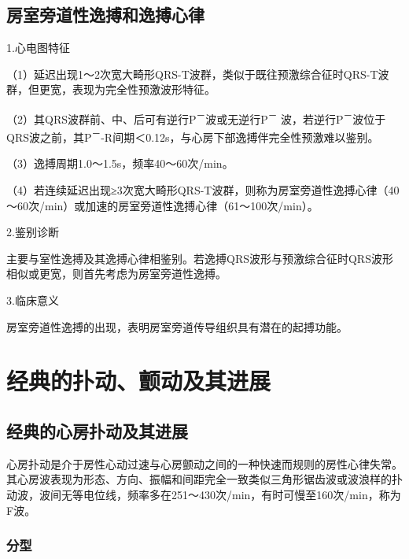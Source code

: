 \protect\hypertarget{text00019.htmlux5cux23subid190}{}{}

\section{房室旁道性逸搏和逸搏心律}

1.心电图特征

（1）延迟出现1～2次宽大畸形QRS-T波群，类似于既往预激综合征时QRS-T波群，但更宽，表现为完全性预激波形特征。

（2）其QRS波群前、中、后可有逆行P\textsuperscript{－}波或无逆行P\textsuperscript{－} 波，若逆行P\textsuperscript{－}波位于QRS波之前，其P\textsuperscript{－}-R间期＜0.12s，与心房下部逸搏伴完全性预激难以鉴别。

（3）逸搏周期1.0～1.5s，频率40～60次/min。

（4）若连续延迟出现≥3次宽大畸形QRS-T波群，则称为房室旁道性逸搏心律（40～60次/min）或加速的房室旁道性逸搏心律（61～100次/min）。

2.鉴别诊断

主要与室性逸搏及其逸搏心律相鉴别。若逸搏QRS波形与预激综合征时QRS波形相似或更宽，则首先考虑为房室旁道性逸搏。

3.临床意义

房室旁道性逸搏的出现，表明房室旁道传导组织具有潜在的起搏功能。

\protect\hypertarget{text00020.html}{}{}

\protect\hypertarget{text00020.htmlux5cux23chapter20}{}{}

\chapter{经典的扑动、颤动及其进展}

\protect\hypertarget{text00020.htmlux5cux23subid191}{}{}

\section{经典的心房扑动及其进展}

心房扑动是介于房性心动过速与心房颤动之间的一种快速而规则的房性心律失常。其心房波表现为形态、方向、振幅和间距完全一致类似三角形锯齿波或波浪样的扑动波，波间无等电位线，频率多在251～430次/min，有时可慢至160次/min，称为F波。

\protect\hypertarget{text00020.htmlux5cux23subid192}{}{}

\subsection{分型}

